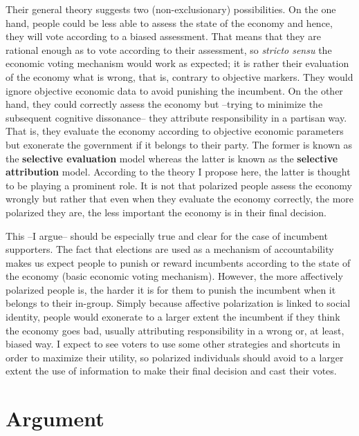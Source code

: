 \documentclass[a4paper, svgnames]{article}
\begin{document}
Their general theory suggests two (non-exclusionary) possibilities. On the one hand, people could be less able to assess the state of the economy and hence, they will vote according to a biased assessment. That means that they are rational enough as to vote according to their assessment, so \textit{stricto sensu} the economic voting mechanism would work as expected; it is rather their evaluation of the economy what is wrong, that is, contrary to objective markers. They would ignore objective economic data to avoid punishing the incumbent. On the other hand, they could correctly assess the economy but --trying to minimize the subsequent cognitive dissonance-- they attribute responsibility in a partisan way. That is, they evaluate the economy according to objective economic parameters but exonerate the government if it belongs to their party. The former is known as the \textbf{selective evaluation} model whereas the latter is known as the \textbf{selective attribution} model. According to the theory I propose here, the latter is thought to be playing a prominent role. It is not that polarized people assess the economy wrongly but rather that even when they evaluate the economy correctly, the more polarized they are, the less important the economy is in their final decision.

This --I argue-- should be especially true and clear for the case of incumbent supporters. The fact that elections are used as a mechanism of accountability makes us expect people to punish or reward incumbents according to the state of the economy (basic economic voting mechanism). However, the more affectively polarized people is, the harder it is for them to punish the incumbent when it belongs to their in-group. Simply because affective polarization is linked to social identity, people would exonerate to a larger extent the incumbent if they think the economy goes bad, usually attributing responsibility in a wrong or, at least, biased way. I expect to see voters to use some other strategies and shortcuts in order to maximize their utility, so polarized individuals should avoid to a larger extent the use of information to make their final decision and cast their votes.

\section{Argument}
\end{document}
